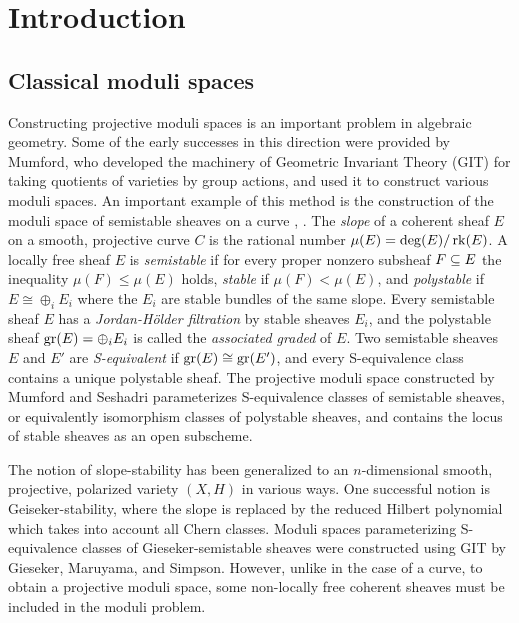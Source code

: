 \chapter{Introduction}\label{chapter:introduction}



\section{Classical moduli spaces}

Constructing projective moduli spaces is an important problem in algebraic geometry. Some of the early successes in this direction were provided by Mumford, who developed the machinery of Geometric Invariant Theory (GIT) for taking quotients of varieties by group actions, and used it to construct various moduli spaces. An important example of this method is the construction of the moduli space of semistable sheaves on a curve \cite{mumford}, \cite{seshadri-space-of-unitary}. The \textit{slope} of a coherent sheaf $E$ on a smooth, projective curve $C$ is the rational number $\mu(E) = \deg(E)/\operatorname{\mathrm{rk}}(E)$. A locally free sheaf $E$ is \textit{semistable} if for every proper nonzero subsheaf $F \subseteq E$ the inequality $\mu(F) \le \mu(E)$ holds, \textit{stable} if $\mu(F) < \mu(E)$, and \textit{polystable} if $E \cong \oplus_i E_i$ where the $E_i$ are stable bundles of the same slope. Every semistable sheaf $E$ has a \textit{Jordan-H\"older filtration} by stable sheaves $E_i$, and the polystable sheaf $\operatorname{\mathrm{gr}}(E) = \oplus_i E_i$ is called the \textit{associated graded} of $E$. Two semistable sheaves $E$ and $E'$ are \textit{S-equivalent} if $\operatorname{\mathrm{gr}}(E) \cong \operatorname{\mathrm{gr}}(E')$, and every S-equivalence class contains a unique polystable sheaf. The projective moduli space constructed by Mumford and Seshadri parameterizes S-equivalence classes of semistable sheaves, or equivalently isomorphism classes of polystable sheaves, and contains the locus of stable sheaves as an open subscheme.

The notion of slope-stability has been generalized to an $n$-dimensional smooth, projective, polarized variety $(X, H)$ in various ways. One successful notion is Geiseker-stability, where the slope is replaced by the reduced Hilbert polynomial which takes into account all Chern classes. Moduli spaces parameterizing S-equivalence classes of Gieseker-semistable sheaves were constructed using GIT by Gieseker, Maruyama, and Simpson. However, unlike in the case of a curve, to obtain a projective moduli space, some non-locally free coherent sheaves must be included in the moduli problem.

